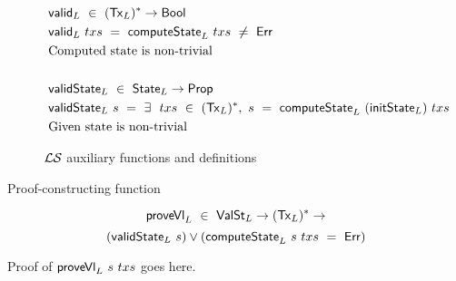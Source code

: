 \begin{figure*}[htb]
\begin{align*}
    & \mathsf{valid}_L ~\in~ (\mathsf{Tx}_L)^{*} \to \mathsf{Bool} \\
    & \mathsf{valid}_L~txs~ = ~\mathsf{computeState}_L ~txs~ \neq ~\mathsf{Err} \\
    & \text{Computed state is non-trivial} \\~\\
    & \mathsf{validState}_L ~\in~ \mathsf{State}_L \to \mathsf{Prop} \\
    & \mathsf{validState}_L~s~ = ~\exists~~txs~\in~(\mathsf{Tx}_L)^{*},~
      s~=~\mathsf{computeState}_L~(\mathsf{initState}_L) ~txs \\
    & \text{Given state is non-trivial}
  \end{align*}
  \caption{$\mathcal{L}\mathcal{S}$ auxiliary functions and definitions}
  \label{fig:ledger-aux}
\end{figure*}

Proof-constructing function

\[\mathsf{proveVl}_L ~\in~ \mathsf{ValSt}_L \to (\mathsf{Tx}_L)^{*} \to \]
\[ (\mathsf{validState}_L~s) \vee (\mathsf{computeState}_L~s~txs~=~\mathsf{Err})\]

Proof of $\mathsf{proveVl}_L~s~txs$ goes here.
